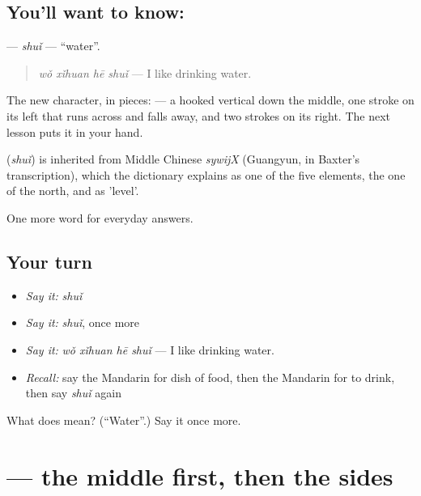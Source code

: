 \subsection*{You'll want to know: }
\textbf{} — \emph{shuǐ} — \textquotedblleft{}water\textquotedblright{}.

\begin{quote}
\textbf{} \emph{wǒ xǐhuan hē shuǐ} — I like drinking water.
\end{quote}

The new character, in pieces:  — a hooked vertical down the middle, one stroke on its left that runs across and falls away, and two strokes on its right. The next lesson puts it in your hand.

\begin{cousinweb}
\textbf{} (\emph{shuǐ}) is inherited from Middle Chinese \emph{sywijX} (Guangyun, in Baxter's transcription), which the dictionary explains as one of the five elements, the one of the north, and as 'level'.
\end{cousinweb}

\begin{grammarlens}[title={What you've built}]
One more word for everyday answers.
\end{grammarlens}

\subsection*{Your turn}
\begin{itemize}
\raggedright
  \item \emph{Say it:} \emph{shuǐ}
  \item \emph{Say it:} \emph{shuǐ}, once more
  \item \emph{Say it:} \emph{wǒ xǐhuan hē shuǐ} — I like drinking water.
  \item \emph{Recall:} say the Mandarin for dish of food, then the Mandarin for to drink, then say \emph{shuǐ} again
\end{itemize}

\begin{tcolorbox}[breakable,colback=teal!4,colframe=teal!35!black,title={Before you move on}]
What does  mean? (\textquotedblleft{}Water\textquotedblright{}.) Say it once more.
\end{tcolorbox}
\section[\texorpdfstring{\zh{水} (shuǐ)}{水 (shuǐ)}]{ — the middle first, then the sides}

